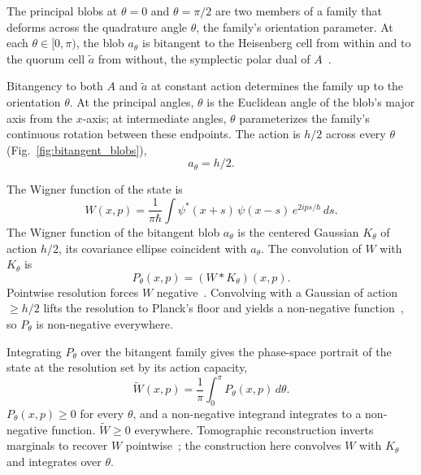 \documentclass[aps,prl,reprint,amsmath,amssymb,floatfix,nofootinbib]{revtex4-2}
\begin{document}
The principal blobs at $\theta = 0$ and $\theta = \pi/2$ are two members of a family that deforms across the quadrature angle $\theta$, the family's orientation parameter. At each $\theta \in [0,\pi)$, the blob $a_\theta$ is bitangent to the Heisenberg cell from within and to the quorum cell $\tilde a$ from without, the symplectic polar dual of $A$~\cite{degosson2022polar}.

Bitangency to both $A$ and $\tilde a$ at constant action determines the family up to the orientation $\theta$. At the principal angles, $\theta$ is the Euclidean angle of the blob's major axis from the $x$-axis; at intermediate angles, $\theta$ parameterizes the family's continuous rotation between these endpoints. The action is $h/2$ across every $\theta$ (Fig.~\ref{fig:bitangent_blobs}),
\begin{equation}
a_\theta = h/2.
\label{eq:bitangent_blob}
\end{equation}


The Wigner function of the state is
\begin{equation}
W(x,p) = \frac{1}{\pi\hbar}\int \psi^*(x+s)\,\psi(x-s)\,e^{2ips/\hbar}\,ds.
\label{eq:wigner}
\end{equation}
The Wigner function of the bitangent blob $a_\theta$ is the centered Gaussian $K_\theta$ of action $h/2$, its covariance ellipse coincident with $a_\theta$. The convolution of $W$ with $K_\theta$ is
\begin{equation}
P_\theta(x,p) = (W * K_\theta)(x,p).
\label{eq:Ptheta}
\end{equation}
Pointwise resolution forces $W$ negative~\cite{hudson1974}. Convolving with a Gaussian of action $\ge h/2$ lifts the resolution to Planck's floor and yields a non-negative function~\cite{cartwright1976,degosson2005bullsci,dragoman2005phasespace,cordero2018}, so $P_\theta$ is non-negative everywhere.

Integrating $P_\theta$ over the bitangent family gives the phase-space portrait of the state at the resolution set by its action capacity,
\begin{equation}
\widetilde{W}(x,p) = \frac{1}{\pi}\int_0^\pi P_\theta(x,p)\,d\theta.
\label{eq:tildeW}
\end{equation}
$P_\theta(x,p) \ge 0$ for every $\theta$, and a non-negative integrand integrates to a non-negative function. $\widetilde W \ge 0$ everywhere. Tomographic reconstruction inverts marginals to recover $W$ pointwise~\cite{vogelrisken1989,lvovsky2009}; the construction here convolves $W$ with $K_\theta$ and integrates over $\theta$.
\end{document}
